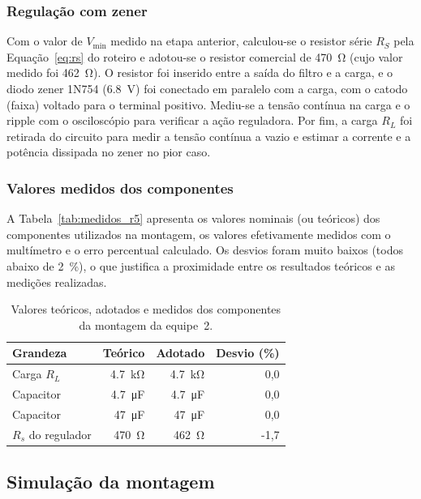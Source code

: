 \documentclass[11pt,a4paper]{article}
\begin{document}
\subsubsection{Regulação com zener}
 
Com o valor de $V_{\min}$ medido na etapa anterior, calculou-se o resistor série $R_S$ pela Equação~\eqref{eq:rs} do roteiro e adotou-se o resistor comercial de \SI{470}{\ohm} (cujo valor medido foi \SI{462}{\ohm}). O resistor foi inserido entre a saída do filtro e a carga, e o diodo zener 1N754 (\SI{6,8}{\volt}) foi conectado em paralelo com a carga, com o catodo (faixa) voltado para o terminal positivo. Mediu-se a tensão contínua na carga e o ripple com o osciloscópio para verificar a ação reguladora. Por fim, a carga $R_L$ foi retirada do circuito para medir a tensão contínua a vazio e estimar a corrente e a potência dissipada no zener no pior caso.
 
\subsubsection{Valores medidos dos componentes}
 
A Tabela~\ref{tab:medidos_r5} apresenta os valores nominais (ou teóricos) dos componentes utilizados na montagem, os valores efetivamente medidos com o multímetro e o erro percentual calculado. Os desvios foram muito baixos (todos abaixo de \SI{2}{\%}), o que justifica a proximidade entre os resultados teóricos e as medições realizadas.
 
\begin{table}[h]
\centering
\caption{Valores teóricos, adotados e medidos dos componentes da montagem da equipe~2.}
\label{tab:medidos_r5_metodologia}
\begin{tabular}{@{}lrrr@{}}
\toprule
\textbf{Grandeza} & \textbf{Teórico} & \textbf{Adotado} & \textbf{Desvio (\%)} \\
\midrule
Carga $R_L$ & \SI{4,7}{\kilo\ohm} & \SI{4,7}{\kilo\ohm} & 0,0 \\
Capacitor & \SI{4,7}{\micro\farad} & \SI{4,7}{\micro\farad} & 0,0 \\
Capacitor & \SI{47}{\micro\farad} & \SI{47}{\micro\farad} & 0,0 \\
$R_s$ do regulador & \SI{470}{\ohm} & \SI{462}{\ohm} & -1,7 \\
\bottomrule
\end{tabular}
\end{table}

\subsection{Simulação da montagem}
\end{document}
